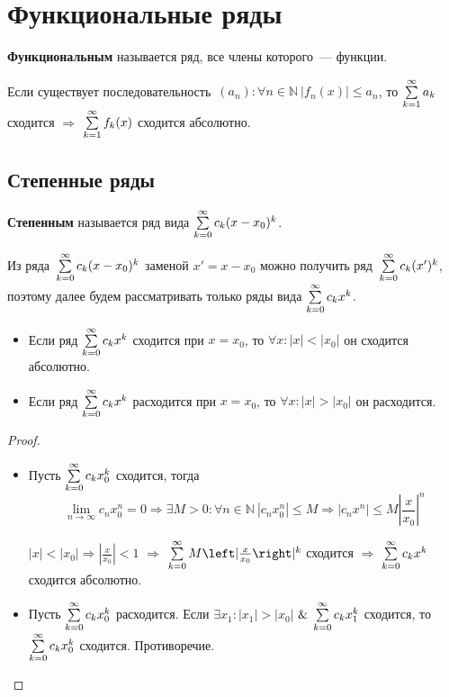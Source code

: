 \section{Функциональные ряды}
 \textbf{Функциональным} называется ряд, все члены которого~--- функции.

\begin{theorem}
Если существует последовательность~$(a_n) \colon \forall n \in \mathbb N \ \allowbreak |f_n(x)| \leqslant a_n$, то $\series a_k$ сходится $\Rightarrow$ $\series f_k(x)$ сходится абсолютно.
\end{theorem}

\subsection{Степенные ряды}
 \textbf{Степенным} называется ряд вида $\series[0] c_k (x - x_0)^k$.

Из ряда~$\series[0] c_k (x - x_0)^k$ заменой $x' = x - x_0$ можно получить ряд~$\series[0] c_k (x')^k$, поэтому далее будем рассматривать только ряды вида $\series[0] c_k x^k$.

\begin{theorem}[Абеля]
\begin{itemize}
	\item Если ряд $\series[0] c_k x^k$ сходится при $x = x_0$, то $\forall x \colon |x| < |x_0|$ он сходится абсолютно.
	\item Если ряд $\series[0] c_k x^k$ расходится при $x = x_0$, то $\forall x \colon |x| > |x_0|$ он расходится.
\end{itemize}
\end{theorem}
\begin{proof}
\begin{itemize}
	\item Пусть $\series[0] c_k x_0^k$ сходится, тогда
	\begin{equation*}
	\lim_{n \to \infty} c_n x_0^n = 0 \Rightarrow
	\exists M > 0 \colon \forall n \in \mathbb N \ |c_n x_0^n| \leqslant M \Rightarrow
	|c_n x^n| \leqslant M \left| \frac{x}{x_0} \right|^n
	\end{equation*}
	
	$|x| < |x_0| \Rightarrow \left| \frac{x}{x_0} \right| < 1$ $\Rightarrow$ $\series[0] M \left| \frac{x}{x_0} \right|^k$ сходится $\Rightarrow$ $\series[0] c_k x^k$ сходится абсолютно.
	
	\item Пусть $\series[0] c_k x_0^k$ расходится.
	Если $\exists x_1 \colon |x_1| > |x_0|$ $\mathrel{\&}$ $\series[0] c_k x_1^k$ сходится, то $\series[0] c_k x_0^k$ сходится.
	Противоречие.
\end{itemize}
\end{proof}

